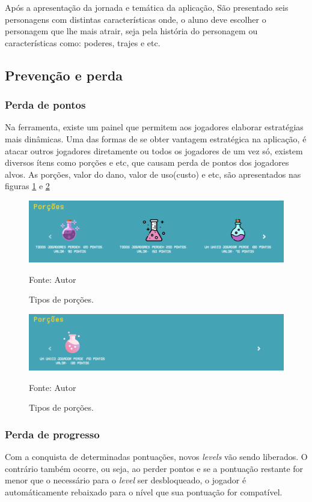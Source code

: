 Após a apresentação da jornada e temática da aplicação, São presentado seis personagens com distintas características onde, o aluno deve escolher o personagem
que lhe mais atrair, seja pela história do personagem ou características como: poderes, trajes e etc.

\subsection{Prevenção e perda}
\subsubsection{Perda de pontos}
Na ferramenta, existe um painel que permitem aos jogadores elaborar estratégias mais dinâmicas. Uma das formas de se obter vantagem estratégica na aplicação, é atacar
outros jogadores diretamente ou todos os jogadores de um vez só, existem diversos ítens como porções e etc, que causam perda de pontos
dos jogadores alvos. As porções, valor do dano, valor de uso(custo) e etc, são apresentados nas figuras \ref{porcoes} e \ref{porcoes2}

\begin{figure}[h]
	\centering
	\includegraphics[keepaspectratio=true,scale=0.4]{figuras/p1.png}
	\caption{Tipos de porções.}
	Fonte: Autor
	\label{porcoes}
\end{figure}

\begin{figure}[h]
	\centering
	\includegraphics[keepaspectratio=true,scale=0.4]{figuras/p2.png}
	\caption{Tipos de porções.}
	Fonte: Autor
	\label{porcoes2}
\end{figure}

\subsubsection{Perda de progresso}
Com a conquista de determinadas pontuações, novos \textit{levels} vão sendo liberados. O contrário também ocorre, ou seja, ao perder 
pontos e se a pontuação restante for menor que o necessário para o \textit{level} ser desbloqueado, o jogador é 
automáticamente rebaixado para o nível que sua pontuação for compatível.

